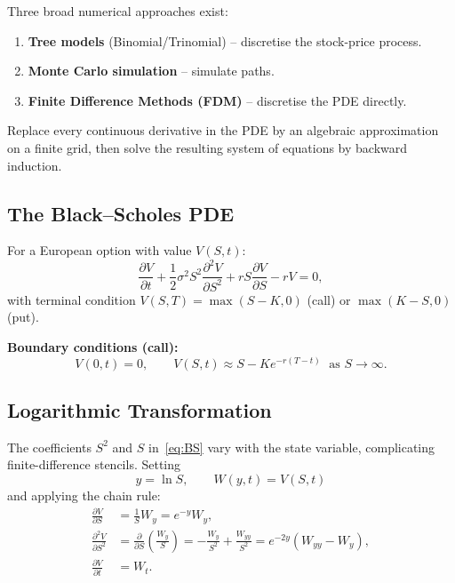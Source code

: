 \documentclass[12pt,a4paper]{article}
\theoremstyle{plain}
\theoremstyle{definition}
\theoremstyle{remark}
\begin{document}
Three broad numerical approaches exist:
\begin{enumerate}
  \item \textbf{Tree models} (Binomial/Trinomial) -- discretise the stock-price process.
  \item \textbf{Monte Carlo simulation} -- simulate paths.
  \item \textbf{Finite Difference Methods (FDM)} -- discretise the PDE directly.
\end{enumerate}

\begin{keybox}
Replace every continuous derivative in the PDE by an algebraic
approximation on a finite grid, then solve the resulting system of
equations by backward induction.
\end{keybox}

\subsection{The Black--Scholes PDE}

For a European option with value $V(S,t)$:
\begin{equation}\label{eq:BS}
  \frac{\partial V}{\partial t}
  +\frac{1}{2}\sigma^{2}S^{2}\frac{\partial^{2}V}{\partial S^{2}}
  +rS\frac{\partial V}{\partial S}
  -rV=0,
\end{equation}
with terminal condition $V(S,T)=\max(S-K,0)$ (call) or $\max(K-S,0)$ (put).

\textbf{Boundary conditions (call):}
\[
  V(0,t)=0,\qquad V(S,t)\approx S-Ke^{-r(T-t)}\;\text{ as }S\to\infty.
\]

\subsection{Logarithmic Transformation}

The coefficients $S^{2}$ and $S$ in~\eqref{eq:BS} vary with the state
variable, complicating finite-difference stencils.  Setting
\[
  y=\ln S,\qquad W(y,t)=V(S,t)
\]
and applying the chain rule:
\begin{align}
  \frac{\partial V}{\partial S}
    &= \frac{1}{S}W_{y} = e^{-y}W_{y},\label{eq:Vs}\\
  \frac{\partial^{2}V}{\partial S^{2}}
    &= \frac{\partial}{\partial S}\!\left(\frac{W_{y}}{S}\right)
     = -\frac{W_{y}}{S^{2}}+\frac{W_{yy}}{S^{2}}
     = e^{-2y}(W_{yy}-W_{y}),\label{eq:Vss}\\
  \frac{\partial V}{\partial t}
    &= W_{t}.\label{eq:Vt}
\end{align}
\end{document}
